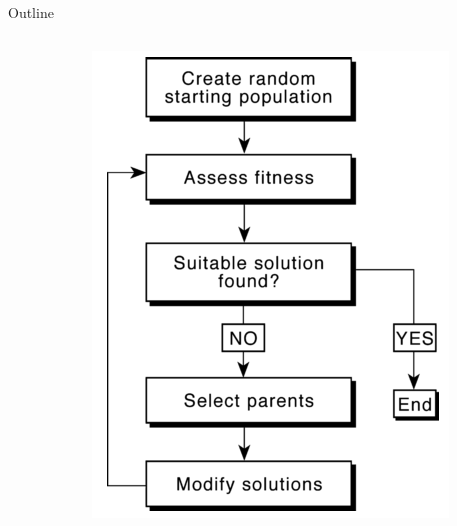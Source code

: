 \documentclass[10pt]{beamer}
\begin{document}
{\begin{frame}{Outline}
\begin{columns}[c]
\begin{column}{.48\textwidth}
		\end{column}
		\hfill
		\begin{column}{0.48\textwidth}
			\begin{figure}
			\includegraphics[width=0.8\linewidth]{images/GA_outline_Carwright.PNG}
			\end{figure}
		\end{column}
	\end{columns}
\end{frame}
}
\end{document}
